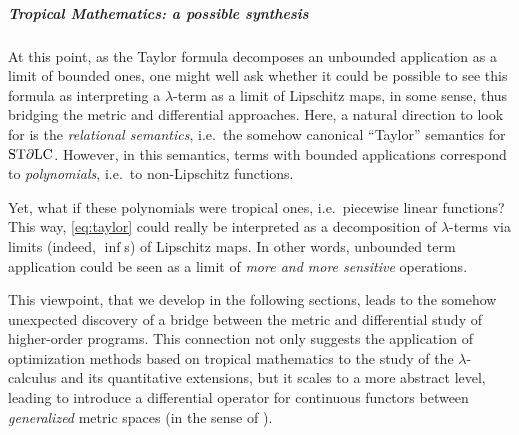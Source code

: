 %


\subparagraph*{Tropical Mathematics: a possible synthesis}%



At this point, as the Taylor formula decomposes an unbounded application as a limit of bounded ones, one might well ask whether it could be possible to see this formula as interpreting  a $\lambda$-term 
as a limit of Lipschitz maps, in some sense, thus bridging the metric and differential approaches.  
Here, a natural direction to look for is the \emph{relational semantics}, i.e.~the somehow canonical ``Taylor'' semantics for $\mathrm{ST}\partial\mathrm{LC}$. 
However, in this semantics, terms with bounded applications correspond to \emph{polynomials}, i.e.~to non-Lipschitz functions. 

Yet, what if these polynomials were tropical ones, i.e.~piecewise linear functions? This way, \eqref{eq:taylor} could really be interpreted as a decomposition of $\lambda$-terms via limits (indeed, $\inf$s) of Lipschitz maps. In other words, unbounded term application could be seen 
as a limit of \emph{more and more sensitive} operations. 


This viewpoint, that we develop in the following sections, leads to the somehow unexpected discovery of a bridge between the metric and differential study of higher-order programs.
This connection not only suggests the application of optimization methods based on tropical mathematics to the study of the $\lambda$-calculus and its quantitative extensions, but it scales to a 
more abstract level, leading to introduce a 
differential operator for continuous functors between \emph{generalized} metric spaces (in the sense of \cite{Lawvere1973}). 